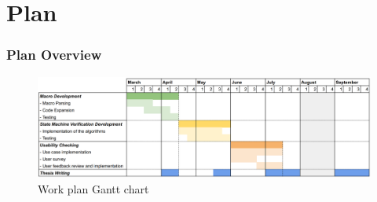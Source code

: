 \documentclass[bigger,notes,aspectratio=169]{beamer}
\begin{document}
\section{Plan}

\begin{frame}
    \frametitle{Plan Overview}

    \begin{figure}[h]
        \centering
        \includegraphics[width=\linewidth]{planning.png}
        \caption{Work plan Gantt chart}
    \end{figure}

\end{frame}
\end{document}
